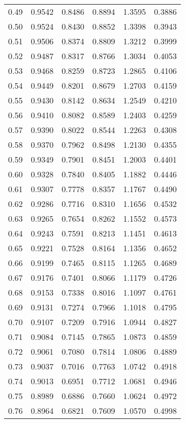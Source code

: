 \documentclass{article}
\begin{document}
\begin{longtable}{cccccc}
0.49 & 0.9542 & 0.8486 & 0.8894 & 1.3595 & 0.3886 \\
0.50 & 0.9524 & 0.8430 & 0.8852 & 1.3398 & 0.3943 \\
0.51 & 0.9506 & 0.8374 & 0.8809 & 1.3212 & 0.3999 \\
0.52 & 0.9487 & 0.8317 & 0.8766 & 1.3034 & 0.4053 \\
0.53 & 0.9468 & 0.8259 & 0.8723 & 1.2865 & 0.4106 \\
0.54 & 0.9449 & 0.8201 & 0.8679 & 1.2703 & 0.4159 \\
0.55 & 0.9430 & 0.8142 & 0.8634 & 1.2549 & 0.4210 \\
0.56 & 0.9410 & 0.8082 & 0.8589 & 1.2403 & 0.4259 \\
0.57 & 0.9390 & 0.8022 & 0.8544 & 1.2263 & 0.4308 \\
0.58 & 0.9370 & 0.7962 & 0.8498 & 1.2130 & 0.4355 \\
0.59 & 0.9349 & 0.7901 & 0.8451 & 1.2003 & 0.4401 \\
0.60 & 0.9328 & 0.7840 & 0.8405 & 1.1882 & 0.4446 \\
0.61 & 0.9307 & 0.7778 & 0.8357 & 1.1767 & 0.4490 \\
0.62 & 0.9286 & 0.7716 & 0.8310 & 1.1656 & 0.4532 \\
0.63 & 0.9265 & 0.7654 & 0.8262 & 1.1552 & 0.4573 \\
0.64 & 0.9243 & 0.7591 & 0.8213 & 1.1451 & 0.4613 \\
0.65 & 0.9221 & 0.7528 & 0.8164 & 1.1356 & 0.4652 \\
0.66 & 0.9199 & 0.7465 & 0.8115 & 1.1265 & 0.4689 \\
0.67 & 0.9176 & 0.7401 & 0.8066 & 1.1179 & 0.4726 \\
0.68 & 0.9153 & 0.7338 & 0.8016 & 1.1097 & 0.4761 \\
0.69 & 0.9131 & 0.7274 & 0.7966 & 1.1018 & 0.4795 \\
0.70 & 0.9107 & 0.7209 & 0.7916 & 1.0944 & 0.4827 \\
0.71 & 0.9084 & 0.7145 & 0.7865 & 1.0873 & 0.4859 \\
0.72 & 0.9061 & 0.7080 & 0.7814 & 1.0806 & 0.4889 \\
0.73 & 0.9037 & 0.7016 & 0.7763 & 1.0742 & 0.4918 \\
0.74 & 0.9013 & 0.6951 & 0.7712 & 1.0681 & 0.4946 \\
0.75 & 0.8989 & 0.6886 & 0.7660 & 1.0624 & 0.4972 \\
0.76 & 0.8964 & 0.6821 & 0.7609 & 1.0570 & 0.4998 \\

\end{longtable}
\end{document}
